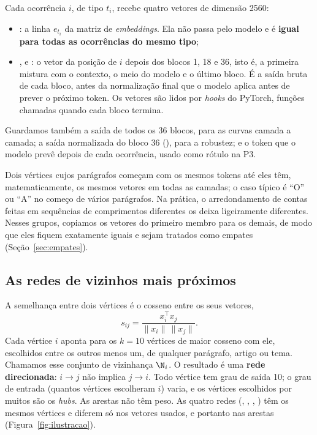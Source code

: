 Cada ocorrência $i$, de tipo $t_i$, recebe quatro vetores de dimensão 2560:
\begin{itemize}
    \item {}: a linha $e_{t_i}$ da matriz de \emph{embeddings}. Ela não passa pelo
    modelo e é \textbf{igual para todas as ocorrências do mesmo tipo};
    \item {},  e : o vetor da posição de $i$ depois dos blocos 1, 18
    e 36, isto é, a primeira mistura com o contexto, o meio do modelo e o último bloco. É a
    saída bruta de cada bloco, antes da normalização final que o modelo aplica antes de
    prever o próximo token. Os vetores são lidos por \emph{hooks} do PyTorch, funções chamadas
    quando cada bloco termina.
\end{itemize}
Guardamos também a saída de todos os 36 blocos, para as curvas camada a camada; a saída
normalizada do bloco 36 (), para a robustez; e o token que o modelo prevê depois de
cada ocorrência, usado como rótulo na P3.

Dois vértices cujos parágrafos começam com os mesmos tokens até eles têm, matematicamente, os
mesmos vetores em todas as camadas; o caso típico é ``O'' ou ``A'' no começo de vários
parágrafos. Na prática, o arredondamento de contas feitas em sequências de comprimentos
diferentes os deixa ligeiramente diferentes. Nesses \nGruposPrefixo{} grupos, copiamos os
vetores do primeiro membro para os demais, de modo que eles fiquem exatamente iguais e sejam
tratados como empates (Seção~\ref{sec:empates}).

\subsection{As redes de vizinhos mais próximos}\label{sec:knn}

A semelhança entre dois vértices é o cosseno entre os seus vetores,
\begin{equation}
    s_{ij}=\frac{x_i^\top x_j}{\lVert x_i\rVert\,\lVert x_j\rVert}.
\end{equation}
Cada vértice $i$ aponta para os $k=10$ vértices de maior cosseno com ele, escolhidos entre os
outros \nVertices{} menos um, de qualquer parágrafo, artigo ou tema. Chamamos esse conjunto de
vizinhança $\N_i$. O resultado é uma \textbf{rede direcionada}: $i\to j$ não implica $j\to i$.
Todo vértice tem grau de saída 10; o grau de entrada (quantos vértices escolheram $i$) varia,
e os vértices escolhidos por muitos são os \emph{hubs}. As arestas não têm peso. As quatro
redes (, , , ) têm os mesmos vértices e diferem só nos
vetores usados, e portanto nas arestas (Figura~\ref{fig:ilustracao}).

